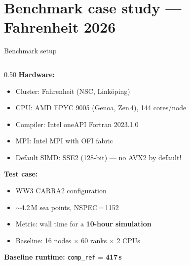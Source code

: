 \documentclass[aspectratio=169,10pt]{beamer}
\begin{document}
\section{Benchmark case study — Fahrenheit 2026}

\begin{frame}[shrink=12]{Benchmark setup}

  \begin{columns}[T]
    \begin{column}{0.50\textwidth}
      \textbf{Hardware:}
      \begin{itemize}
        \item Cluster: Fahrenheit (NSC, Linköping)
        \item CPU: AMD EPYC 9005 (Genoa, Zen\,4), 144 cores/node
        \item Compiler: Intel oneAPI Fortran 2023.1.0
        \item MPI: Intel MPI with OFI fabric
        \item Default SIMD: \alert{SSE2 (128-bit)} --- no AVX2 by default!
      \end{itemize}

      \vspace{0.4em}
      \textbf{Test case:}
      \begin{itemize}
        \item WW3 CARRA2 configuration
        \item $\sim$4.2\,M sea points, NSPEC\,=\,1152
        \item Metric: wall time for a \textbf{10-hour simulation}
        \item Baseline: 16 nodes $\times$ 60 ranks $\times$ 2 CPUs
      \end{itemize}

      \vspace{0.3em}
      \textbf{Baseline runtime:} \texttt{comp\_ref} = \textbf{417\,s}
    \end{column}


\end{columns}
\end{frame}
\end{document}
